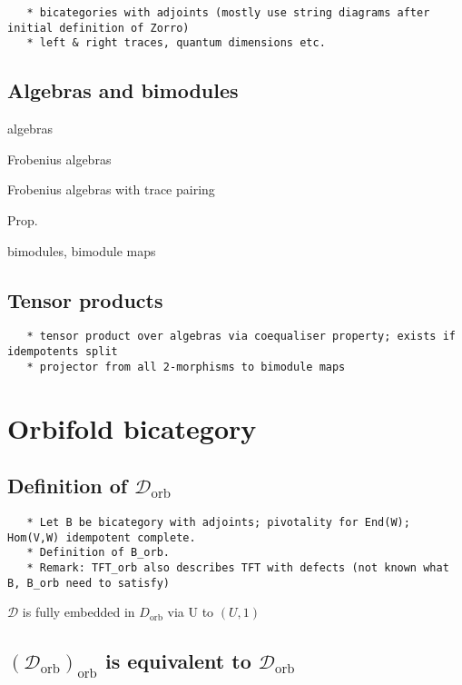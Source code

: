 \documentclass[12pt]{scrartcl}
\theoremstyle{definition}
\numberwithin{equation}{section}
\numberwithin{definition}{section}
\numberwithin{figure}{section}
\begin{document}
\begin{verbatim}
   * bicategories with adjoints (mostly use string diagrams after initial definition of Zorro)
   * left & right traces, quantum dimensions etc. 
\end{verbatim}

\subsection{Algebras and bimodules}

algebras

Frobenius algebras

Frobenius algebras with trace pairing

Prop.

bimodules, bimodule maps

\subsection{Tensor products}

\begin{verbatim}
   * tensor product over algebras via coequaliser property; exists if idempotents split
   * projector from all 2-morphisms to bimodule maps
\end{verbatim}

\section{Orbifold bicategory}

\subsection{Definition of $\mathcal{D}_\mathrm{orb}$}

\begin{verbatim}
   * Let B be bicategory with adjoints; pivotality for End(W); Hom(V,W) idempotent complete. 
   * Definition of B_orb. 
   * Remark: TFT_orb also describes TFT with defects (not known what B, B_orb need to satisfy)
\end{verbatim}

$\mathcal{D}$ is fully embedded in $D_\mathrm{orb}$ via U to $(U,1)$

\subsection{$(\mathcal{D}_\mathrm{orb})_\mathrm{orb}$ is equivalent to $\mathcal{D}_\mathrm{orb}$}
\end{document}
